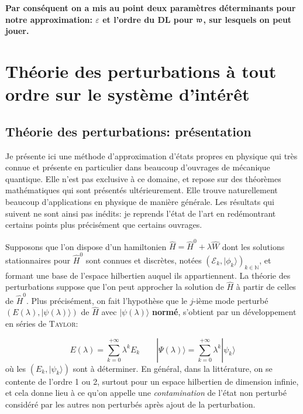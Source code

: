 \documentclass[svgnames,dvipsnames,a4paper,10pt,french]{report}
\begin{document}
\textbf{Par conséquent on a mis au point deux  paramètres déterminants pour notre approximation: $\varepsilon$ et l'ordre du DL pour $\frak{w}$, sur lesquels on peut jouer.}






\section{Théorie des perturbations à tout ordre sur le système d'intérêt}

\subsection{Théorie des perturbations: présentation}

Je présente ici une méthode d'approximation d'états propres en physique qui très connue et présente en particulier dans beaucoup d'ouvrages de mécanique quantique. Elle n'est pas exclusive à ce domaine, et repose sur des théorèmes mathématiques qui sont présentés ultérieurement. Elle trouve naturellement beaucoup d'applications en physique de manière générale. Les résultats qui suivent ne sont ainsi pas inédits: je reprends l'état de l'art en redémontrant certains points plus précisément que certains ouvrages. 


Supposons que l'on dispose d'un hamiltonien $\hat{H} = \hat{H}^0 +  \lambda \hat{W}$ dont les solutions stationnaires pour $\hat{H}^0$ sont connues et discrètes, notées $(\mathcal{E}_k,|\phi_k \rangle)_{k\in\mathbb{N}}$, et formant une base de l'espace hilbertien auquel ils appartiennent. La théorie des perturbations suppose que l'on peut approcher la solution de $\hat{H}$ à partir de celles de $\hat{H}^0$. Plus précisément, on fait l'hypothèse que le $j$-ième mode perturbé $(E(\lambda),|\psi(\lambda) \rangle)$ de $\hat{H}$ avec $|\psi(\lambda)\rangle$ \textbf{normé},  s'obtient par un développement en séries de \textsc{Taylor}:

\begin{equation}
    E(\lambda) =  \sum_{k=0}^{+\infty} \lambda^k E_k \qquad |\Psi(\lambda)\rangle = \sum_{k=0}^{+\infty} \lambda^k |\psi_k\rangle
\end{equation}
où les $(E_k,|\psi_k\rangle)$ sont à déterminer. En général, dans la littérature, on se contente de l'ordre 1 ou 2, surtout pour un espace hilbertien de dimension infinie, et cela donne lieu à ce qu'on appelle une \textit{contamination} de l'état non perturbé considéré par les autres non perturbés après ajout de la perturbation.
\end{document}
